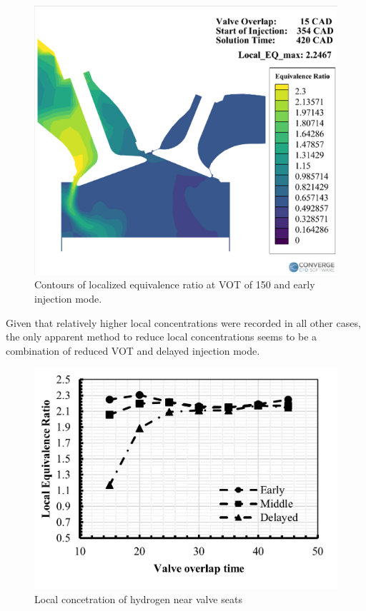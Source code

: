 \documentclass[conference]{IEEEtran}
\begin{document}
\begin{figure}[htbp]
    \centerline{\includegraphics{plots and graphs/5.png}}
    \caption{Contours of localized equivalence ratio at VOT of 150 and early injection mode.}
    \label{plt_5}
    \end{figure}

    Given that relatively higher local concentrations were recorded in all other cases, the only apparent method to reduce local concentrations seems to be a combination of reduced VOT and delayed injection mode.


\begin{figure}[htbp]
    \centerline{\includegraphics{plots and graphs/6.png}}
    \caption{Local concetration of hydrogen near valve seats}
    \label{plt_6}
    \end{figure}
    
\end{document}
